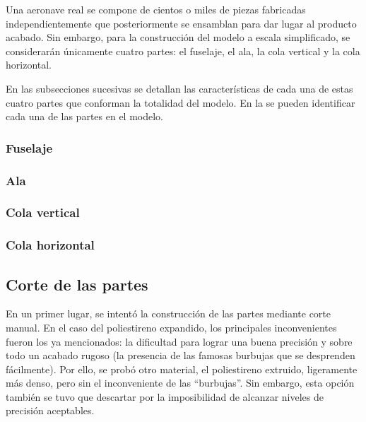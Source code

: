 Una aeronave real se compone de cientos o miles de piezas fabricadas independientemente que posteriormente se ensamblan para dar lugar al producto acabado. Sin embargo, para la construcción del modelo a escala simplificado, se considerarán únicamente cuatro partes: el fuselaje, el ala, la cola vertical y la cola horizontal.

En las subsecciones sucesivas se detallan las características de cada una de estas cuatro partes que conforman la totalidad del modelo. En la  se pueden identificar cada una de las partes en el modelo.

\subsubsection{Fuselaje}
\label{sec:building:parts:fuselage}
\FloatBarrier

\subsubsection{Ala}
\label{sec:building:parts:wing}
\FloatBarrier

\subsubsection{Cola vertical}
\label{sec:building:parts:vtail}
\FloatBarrier

\subsubsection{Cola horizontal}
\label{sec:building:parts:htail}
\FloatBarrier


\subsection{Corte de las partes}
\label{sec:building:technique}

En un primer lugar, se intentó la construcción de las partes mediante corte manual. En el caso del poliestireno expandido, los principales inconvenientes fueron los ya mencionados: la dificultad para lograr una buena precisión y sobre todo un acabado rugoso (la presencia de las famosas burbujas que se desprenden fácilmente). Por ello, se probó otro material, el poliestireno extruido, ligeramente más denso\cite{ref:poliestirenoextruido}, pero sin el inconveniente de las “burbujas”. Sin embargo, esta opción también se tuvo que descartar por la imposibilidad de alcanzar niveles de precisión aceptables.

